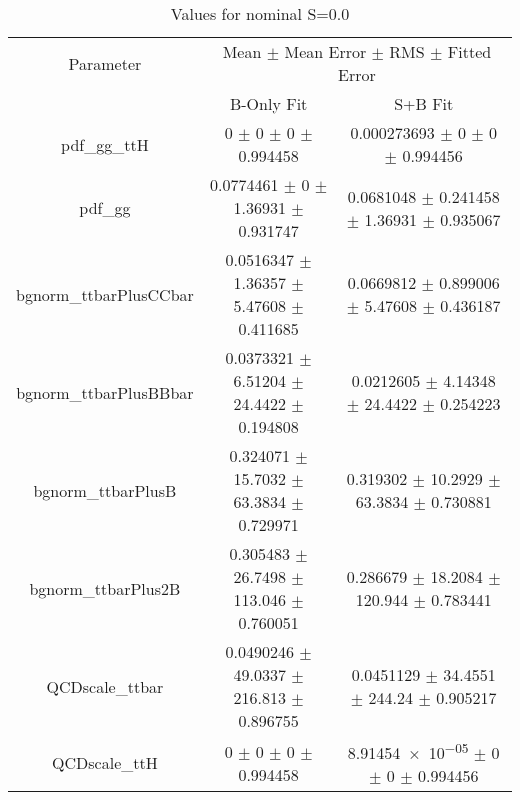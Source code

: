 \begin{table}
\centering
\caption{Values for nominal S=0.0}
\begin{tabular}{ccc}
\toprule
Parameter & \multicolumn{2}{c}{Mean $\pm$ Mean Error $\pm$ RMS $\pm$ Fitted Error}\\
 & B-Only Fit & S+B Fit\\
\midrule
pdf\_gg\_ttH & \num{0} $\pm$ \num{0} $\pm$ \num{0} $\pm$ \num{0.994458} & \num{0.000273693} $\pm$ \num{0} $\pm$ \num{0} $\pm$ \num{0.994456}\\
pdf\_gg & \num{0.0774461} $\pm$ \num{0} $\pm$ \num{1.36931} $\pm$ \num{0.931747} & \num{0.0681048} $\pm$ \num{0.241458} $\pm$ \num{1.36931} $\pm$ \num{0.935067}\\
bgnorm\_ttbarPlusCCbar & \num{0.0516347} $\pm$ \num{1.36357} $\pm$ \num{5.47608} $\pm$ \num{0.411685} & \num{0.0669812} $\pm$ \num{0.899006} $\pm$ \num{5.47608} $\pm$ \num{0.436187}\\
bgnorm\_ttbarPlusBBbar & \num{0.0373321} $\pm$ \num{6.51204} $\pm$ \num{24.4422} $\pm$ \num{0.194808} & \num{0.0212605} $\pm$ \num{4.14348} $\pm$ \num{24.4422} $\pm$ \num{0.254223}\\
bgnorm\_ttbarPlusB & \num{0.324071} $\pm$ \num{15.7032} $\pm$ \num{63.3834} $\pm$ \num{0.729971} & \num{0.319302} $\pm$ \num{10.2929} $\pm$ \num{63.3834} $\pm$ \num{0.730881}\\
bgnorm\_ttbarPlus2B & \num{0.305483} $\pm$ \num{26.7498} $\pm$ \num{113.046} $\pm$ \num{0.760051} & \num{0.286679} $\pm$ \num{18.2084} $\pm$ \num{120.944} $\pm$ \num{0.783441}\\
QCDscale\_ttbar & \num{0.0490246} $\pm$ \num{49.0337} $\pm$ \num{216.813} $\pm$ \num{0.896755} & \num{0.0451129} $\pm$ \num{34.4551} $\pm$ \num{244.24} $\pm$ \num{0.905217}\\
QCDscale\_ttH & \num{0} $\pm$ \num{0} $\pm$ \num{0} $\pm$ \num{0.994458} & \num{8.91454e-05} $\pm$ \num{0} $\pm$ \num{0} $\pm$ \num{0.994456}\\
\bottomrule
\end{tabular}
\end{table}